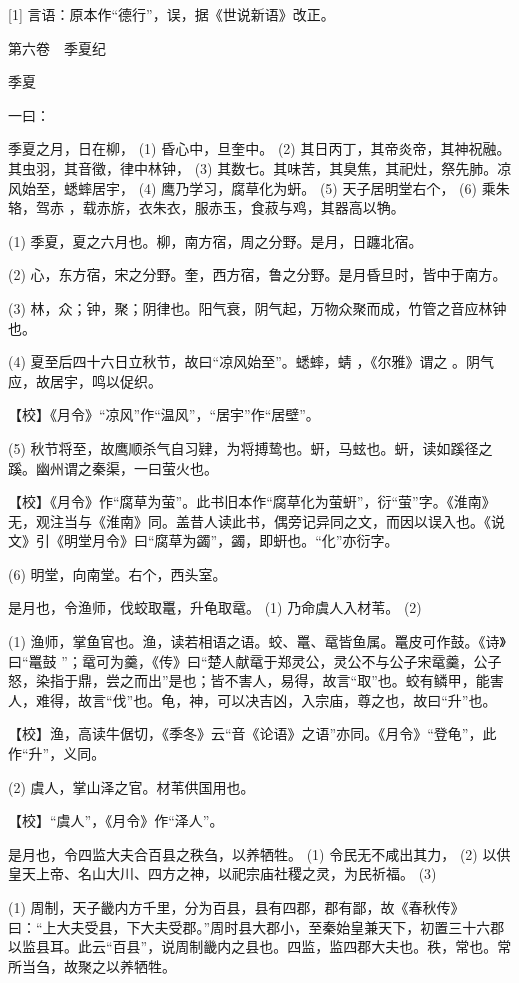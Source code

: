 \documentclass[12pt,UTF8]{ctexbook}
\begin{document}
[1] 言语：原本作“德行”，误，据《世说新语》改正。





第六卷　季夏纪



季夏


一曰：

季夏之月，日在柳， (1) 昏心中，旦奎中。 (2) 其日丙丁，其帝炎帝，其神祝融。其虫羽，其音徵，律中林钟， (3) 其数七。其味苦，其臭焦，其祀灶，祭先肺。凉风始至，蟋蟀居宇， (4) 鹰乃学习，腐草化为蚈。 (5) 天子居明堂右个， (6) 乘朱辂，驾赤 ，载赤旂，衣朱衣，服赤玉，食菽与鸡，其器高以觕。

(1) 季夏，夏之六月也。柳，南方宿，周之分野。是月，日躔北宿。

(2) 心，东方宿，宋之分野。奎，西方宿，鲁之分野。是月昏旦时，皆中于南方。

(3) 林，众；钟，聚；阴律也。阳气衰，阴气起，万物众聚而成，竹管之音应林钟也。

(4) 夏至后四十六日立秋节，故曰“凉风始至”。蟋蟀，蜻 ，《尔雅》谓之 。阴气应，故居宇，鸣以促织。

【校】《月令》“凉风”作“温风”，“居宇”作“居壁”。

(5) 秋节将至，故鹰顺杀气自习肄，为将搏鸷也。蚈，马蚿也。蚈，读如蹊径之蹊。幽州谓之秦渠，一曰萤火也。

【校】《月令》作“腐草为萤”。此书旧本作“腐草化为萤蚈”，衍“萤”字。《淮南》无，观注当与《淮南》同。盖昔人读此书，偶旁记异同之文，而因以误入也。《说文》引《明堂月令》曰“腐草为蠲”，蠲，即蚈也。“化”亦衍字。

(6) 明堂，向南堂。右个，西头室。

是月也，令渔师，伐蛟取鼍，升龟取鼋。 (1) 乃命虞人入材苇。 (2)

(1) 渔师，掌鱼官也。渔，读若相语之语。蛟、鼍、鼋皆鱼属。鼍皮可作鼓。《诗》曰“鼍鼓 ”；鼋可为羹，《传》曰“楚人献鼋于郑灵公，灵公不与公子宋鼋羹，公子怒，染指于鼎，尝之而出”是也；皆不害人，易得，故言“取”也。蛟有鳞甲，能害人，难得，故言“伐”也。龟，神，可以决吉凶，入宗庙，尊之也，故曰“升”也。

【校】渔，高读牛倨切，《季冬》云“音《论语》之语”亦同。《月令》“登龟”，此作“升”，义同。

(2) 虞人，掌山泽之官。材苇供国用也。

【校】“虞人”，《月令》作“泽人”。

是月也，令四监大夫合百县之秩刍，以养牺牲。 (1) 令民无不咸出其力， (2) 以供皇天上帝、名山大川、四方之神，以祀宗庙社稷之灵，为民祈福。 (3)

(1) 周制，天子畿内方千里，分为百县，县有四郡，郡有鄙，故《春秋传》曰：“上大夫受县，下大夫受郡。”周时县大郡小，至秦始皇兼天下，初置三十六郡以监县耳。此云“百县”，说周制畿内之县也。四监，监四郡大夫也。秩，常也。常所当刍，故聚之以养牺牲。
\end{document}

